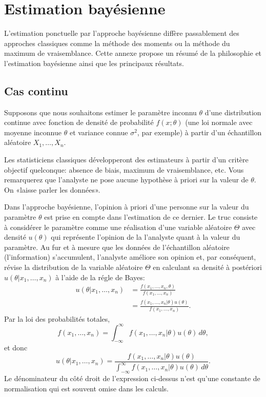 \chapter{Estimation bayésienne}
\label{chap:estimation-bayesienne}

L'estimation ponctuelle par l'approche bayésienne diffère passablement
des approches classiques comme la méthode des moments ou la méthode du
maximum de vraisemblance. Cette annexe propose un résumé de la
philosophie et l'estimation bayésienne ainsi que les principaux
résultats.

\section{Cas continu}
\label{sec:estimation-bayesienne:continu}

Supposons que nous souhaitons estimer le paramètre inconnu $\theta$
d'une distribution continue avec fonction de densité de probabilité
$f(x;\theta)$ (une loi normale avec moyenne inconnue $\theta$ et
variance connue $\sigma^2$, par exemple) à partir d'un échantillon
aléatoire $X_1, \dots, X_n$.

Les statisticiens classiques développeront des estimateurs à partir
d'un critère objectif quelconque: absence de biais, maximum de
vraisemblance, etc. Vous remarquerez que l'analyste ne pose aucune
hypothèse à priori sur la valeur de $\theta$. On «laisse parler les
données».

Dans l'approche bayésienne, l'opinion à priori d'une personne sur la
valeur du paramètre $\theta$ est prise en compte dans l'estimation de
ce dernier. Le truc consiste à considérer le paramètre comme une
réalisation d'une variable aléatoire $\Theta$ avec densité $u(\theta)$
qui représente l'opinion de la l'analyste quant à la valeur du
paramètre. Au fur et à mesure que les données de l'échantillon
aléatoire (l'information) s'accumulent, l'analyste améliore son
opinion et, par conséquent, révise la distribution de la variable
aléatoire $\Theta$ en calculant sa densité à postériori
$u(\theta|x_1, \dots, x_n)$ à l'aide de la régle de Bayes:
\begin{align*}
  u(\theta|x_1, \dots, x_n)
  &= \frac{f(x_1, \dots, x_n, \theta)}{f(x_1, \dots, x_n)} \\
  &= \frac{f(x_1, \dots, x_n|\theta) u(\theta)}{f(x_1, \dots, x_n)}.
\end{align*}
Par la loi des probabilités totales,
\begin{equation*}
  f(x_1, \dots, x_n) =
  \int_{-\infty}^\infty f(x_1, \dots, x_n|\theta) u(\theta)\,d\theta,
\end{equation*}
et donc
\begin{equation*}
  u(\theta|x_1, \dots, x_n)
  = \frac{f(x_1, \dots, x_n|\theta) u(\theta)}
      {\int_{-\infty}^\infty f(x_1, \dots, x_n|\theta) u(\theta)\, d\theta}.
\end{equation*}
Le dénominateur du côté droit de l'expression ci-dessus n'est qu'une
constante de normalisation qui est souvent omise dans les calculs.

